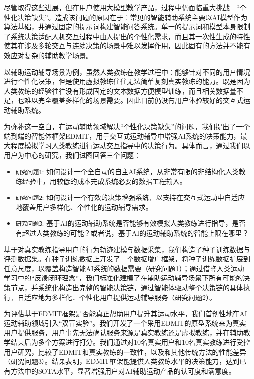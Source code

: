 \documentclass[sigconf]{acmart}
\begin{document}
尽管取得这些进展，但在用户使用大模型教学产品，过程中仍面临重大挑战：“个性化决策缺失”。造成该问题的原因在于：常见的智能辅助系统主要以AI模型作为算法基础，并通过固定的提示词构建智能问答系统\cite{goldbachIntelligentTutoringSystems2020,kwonBIPEDPedagogicallyInformed2024}。单一的提示词和模型本身限制了系统决策适配人机交互过程中由人提出的个性化需求，而且其一次性生成的特性使其在涉及多轮交互与连续决策的场景中难以发挥作用，因此固有的方法并不能有效应对复杂的辅助教学场景。

以辅助运动辅导场景为例，虽然人类教练在教学过程中：能够针对不同的用户情况进行个性化决策，但是使用虚拟教练往往无法简单复刻真实教练的能力。既是因为人类教练的经验往往没有形成固定的文本数据方便模型训练，而且相关数据量不足，也难以完全覆盖多样化的场景需要。因此目前仍没有用户体验较好的交互式运动辅助系统。

为弥补这一空白，在运动辅助领域解决“个性化决策缺失”的问题，我们提出了一个端到端的智能体框架EDMIT，用于交互式运动辅导中增强AI系统的决策能力，最大程度模拟学习人类教练进行运动交互指导中的决策行为。具体而言，通过我们以用户为中心的研究，我们试图回答三个问题：

\begin{itemize}
  \item {\texttt{研究问题1}}: 如何设计一个全自动的自主AI系统，从非常有限的非结构化人类教练经验中，用较低的成本完成系统必要的数据工程输入。
  \item {\texttt{研究问题2}}: 如何设计一个有效的决策增强系统，以支持在交互式运动中自适应地覆盖用户多样化、个性化的运动辅导需求。
  \item {\texttt{研究问题3}}: 基于AI的运动辅助系统是否能够有效模拟人类教练进行指导，是否有超过人类教练的可能？或者说，基于AI的运动辅助系统的智能上限在哪里？
\end{itemize}

基于对真实教练指导用户的行为轨迹建模与数据采集，我们构造了种子训练数据与评测数据集。在种子训练数据上开发了一个数据增广框架，将种子训练数据扩展到任意尺度，以覆盖构造智能AI系统的数据需要（研究问题1）；通过借鉴人类运动学习中的“反馈闭环理念”，我们标准化建模了在辅助运动辅导场景下所有可能的决策节点，并系统化构造出完整的智能决策链，通过智能体驱动整个决策链的具体执行，自适应地为多样化、个性化用户提供运动辅导服务（研究问题2）。

为评估基于EDMIT框架是否能真正帮助用户提升其运动水平，我们首创性地在AI运动辅助领域引入“双盲实验”。我们开发了一个采用EDMIT的原型系统来为真实用户提供服务，用户事先无法确认服务来源是真实教练还是虚拟教练，并在辅助教学结束后为多个方案进行打分。我们通过对10名真实用户和10名真实教练进行受控用户研究，比较了EDMIT和真实教练的一致性，以及和其他传统方法的性能差异（研究问题3）。结果表明，EDMIT框架能提供人类教练水平的决策能力，达到已有方法中的SOTA水平，显著增强用户对AI辅助运动产品的认可度和满意度。
\end{document}
